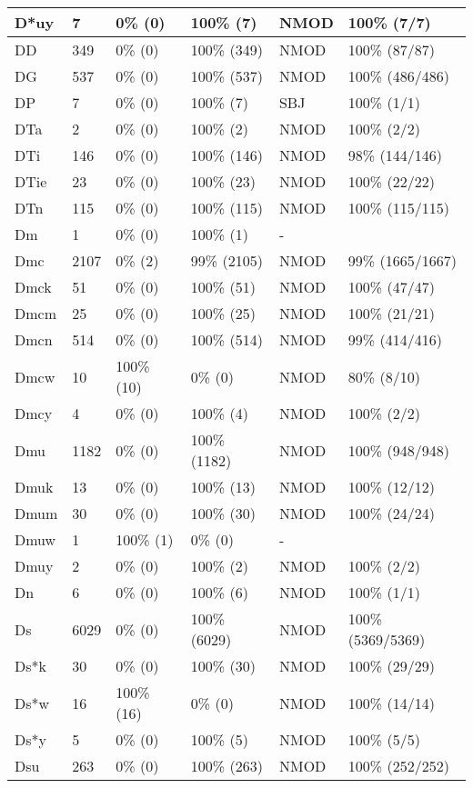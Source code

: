 \begin{figure*}
\begin{tabular}{|l|l|l|l||l|l|}
\hline
 D*uy & 7 & 0\% (0) & 100\% (7) & NMOD & 100\% (7/7) \\ 
\hline
 DD & 349 & 0\% (0) & 100\% (349) & NMOD & 100\% (87/87) \\ 
\hline
 DG & 537 & 0\% (0) & 100\% (537) & NMOD & 100\% (486/486) \\ 
\hline
 DP & 7 & 0\% (0) & 100\% (7) & SBJ & 100\% (1/1) \\ 
\hline
 DTa & 2 & 0\% (0) & 100\% (2) & NMOD & 100\% (2/2) \\ 
\hline
 DTi & 146 & 0\% (0) & 100\% (146) & NMOD & 98\% (144/146) \\ 
\hline
 DTie & 23 & 0\% (0) & 100\% (23) & NMOD & 100\% (22/22) \\ 
\hline
 DTn & 115 & 0\% (0) & 100\% (115) & NMOD & 100\% (115/115) \\ 
\hline
 Dm & 1 & 0\% (0) & 100\% (1) & - &  \\ 
\hline
 Dmc & 2107 & 0\% (2) & 99\% (2105) & NMOD & 99\% (1665/1667) \\ 
\hline
 Dmck & 51 & 0\% (0) & 100\% (51) & NMOD & 100\% (47/47) \\ 
\hline
 Dmcm & 25 & 0\% (0) & 100\% (25) & NMOD & 100\% (21/21) \\ 
\hline
 Dmcn & 514 & 0\% (0) & 100\% (514) & NMOD & 99\% (414/416) \\ 
\hline
 Dmcw & 10 & 100\% (10) & 0\% (0) & NMOD & 80\% (8/10) \\ 
\hline
 Dmcy & 4 & 0\% (0) & 100\% (4) & NMOD & 100\% (2/2) \\ 
\hline
 Dmu & 1182 & 0\% (0) & 100\% (1182) & NMOD & 100\% (948/948) \\ 
\hline
 Dmuk & 13 & 0\% (0) & 100\% (13) & NMOD & 100\% (12/12) \\ 
\hline
 Dmum & 30 & 0\% (0) & 100\% (30) & NMOD & 100\% (24/24) \\ 
\hline
 Dmuw & 1 & 100\% (1) & 0\% (0) & - &  \\ 
\hline
 Dmuy & 2 & 0\% (0) & 100\% (2) & NMOD & 100\% (2/2) \\ 
\hline
 Dn & 6 & 0\% (0) & 100\% (6) & NMOD & 100\% (1/1) \\ 
\hline
 Ds & 6029 & 0\% (0) & 100\% (6029) & NMOD & 100\% (5369/5369) \\ 
\hline
 Ds*k & 30 & 0\% (0) & 100\% (30) & NMOD & 100\% (29/29) \\ 
\hline
 Ds*w & 16 & 100\% (16) & 0\% (0) & NMOD & 100\% (14/14) \\ 
\hline
 Ds*y & 5 & 0\% (0) & 100\% (5) & NMOD & 100\% (5/5) \\ 
\hline
 Dsu & 263 & 0\% (0) & 100\% (263) & NMOD & 100\% (252/252) \\ 
\hline
\end{tabular}
\end{figure*}

